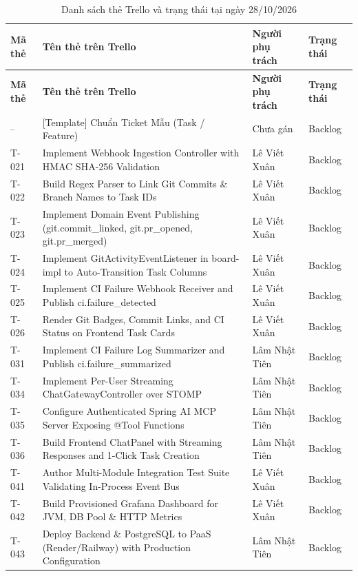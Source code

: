 \documentclass[12pt,a4paper]{report}
\begin{document}
\small
\begin{longtable}{@{}p{1.3cm}p{8.0cm}p{2.7cm}p{2.4cm}@{}}
\caption{Danh sách thẻ Trello và trạng thái tại ngày 28/10/2026}
\label{tab:trello-card-status}\\
\toprule
\textbf{Mã thẻ} & \textbf{Tên thẻ trên Trello} & \textbf{Người phụ trách} & \textbf{Trạng thái} \\
\midrule
\endfirsthead
\toprule
\textbf{Mã thẻ} & \textbf{Tên thẻ trên Trello} & \textbf{Người phụ trách} & \textbf{Trạng thái} \\
\midrule
\endhead
\bottomrule
\endfoot
-- & [Template] Chuẩn Ticket Mẫu (Task / Feature) & Chưa gán & Backlog \\
T-021 & Implement Webhook Ingestion Controller with HMAC SHA-256 Validation & Lê Viết Xuân & Backlog \\
T-022 & Build Regex Parser to Link Git Commits \& Branch Names to Task IDs & Lê Viết Xuân & Backlog \\
T-023 & Implement Domain Event Publishing (git.commit\_linked, git.pr\_opened, git.pr\_merged) & Lê Viết Xuân & Backlog \\
T-024 & Implement GitActivityEventListener in board-impl to Auto-Transition Task Columns & Lê Viết Xuân & Backlog \\
T-025 & Implement CI Failure Webhook Receiver and Publish ci.failure\_detected & Lê Viết Xuân & Backlog \\
T-026 & Render Git Badges, Commit Links, and CI Status on Frontend Task Cards & Lê Viết Xuân & Backlog \\
T-031 & Implement CI Failure Log Summarizer and Publish ci.failure\_summarized & Lâm Nhật Tiên & Backlog \\
T-034 & Implement Per-User Streaming ChatGatewayController over STOMP & Lâm Nhật Tiên & Backlog \\
T-035 & Configure Authenticated Spring AI MCP Server Exposing @Tool Functions & Lâm Nhật Tiên & Backlog \\
T-036 & Build Frontend ChatPanel with Streaming Responses and 1-Click Task Creation & Lâm Nhật Tiên & Backlog \\
T-041 & Author Multi-Module Integration Test Suite Validating In-Process Event Bus & Lê Viết Xuân & Backlog \\
T-042 & Build Provisioned Grafana Dashboard for JVM, DB Pool \& HTTP Metrics & Lê Viết Xuân & Backlog \\
T-043 & Deploy Backend \& PostgreSQL to PaaS (Render/Railway) with Production Configuration & Lâm Nhật Tiên & Backlog \\

\end{longtable}
\end{document}

